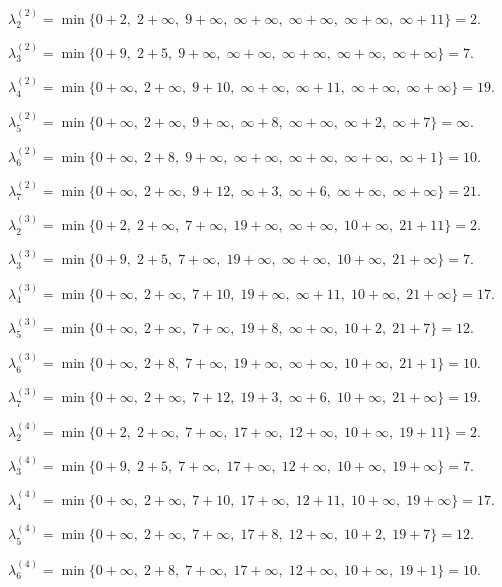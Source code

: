 \documentclass[fleqn]{article}
\begin{document}
$\lambda_2^{(2)} =\min\{0+2,\; 2+\infty,\; 9+\infty,\; \infty+\infty,\; \infty+\infty,\; \infty+\infty,\; \infty+11\}=2.$

$\lambda_3^{(2)} =\min\{0+9,\; 2+5,\; 9+\infty,\; \infty+\infty,\; \infty+\infty,\; \infty+\infty,\; \infty+\infty\}=7.$

$\lambda_4^{(2)} =\min\{0+\infty,\; 2+\infty,\; 9+10,\; \infty+\infty,\; \infty+11,\; \infty+\infty,\; \infty+\infty\}=19.$

$\lambda_5^{(2)} =\min\{0+\infty,\; 2+\infty,\; 9+\infty,\; \infty+8,\; \infty+\infty,\; \infty+2,\; \infty+7\}=\infty.$

$\lambda_6^{(2)} =\min\{0+\infty,\; 2+8,\; 9+\infty,\; \infty+\infty,\; \infty+\infty,\; \infty+\infty,\; \infty+1\}=10.$

$\lambda_7^{(2)} =\min\{0+\infty,\; 2+\infty,\; 9+12,\; \infty+3,\; \infty+6,\; \infty+\infty,\; \infty+\infty\}=21.$

\medskip

$\lambda_2^{(3)} =\min\{0+2,\; 2+\infty,\; 7+\infty,\; 19+\infty,\; \infty+\infty,\; 10+\infty,\; 21+11\}=2.$

$\lambda_3^{(3)} =\min\{0+9,\; 2+5,\; 7+\infty,\; 19+\infty,\; \infty+\infty,\; 10+\infty,\; 21+\infty\}=7.$

$\lambda_4^{(3)} =\min\{0+\infty,\; 2+\infty,\; 7+10,\; 19+\infty,\; \infty+11,\; 10+\infty,\; 21+\infty\}=17.$

$\lambda_5^{(3)} =\min\{0+\infty,\; 2+\infty,\; 7+\infty,\; 19+8,\; \infty+\infty,\; 10+2,\; 21+7\}=12.$

$\lambda_6^{(3)} =\min\{0+\infty,\; 2+8,\; 7+\infty,\; 19+\infty,\; \infty+\infty,\; 10+\infty,\; 21+1\}=10.$

$\lambda_7^{(3)} =\min\{0+\infty,\; 2+\infty,\; 7+12,\; 19+3,\; \infty+6,\; 10+\infty,\; 21+\infty\}=19.$


\medskip

$\lambda_2^{(4)} =\min\{0+2,\; 2+\infty,\; 7+\infty,\; 17+\infty,\; 12+\infty,\; 10+\infty,\; 19+11\}=2.$

$\lambda_3^{(4)} =\min\{0+9,\; 2+5,\; 7+\infty,\; 17+\infty,\; 12+\infty,\; 10+\infty,\; 19+\infty\}=7.$

$\lambda_4^{(4)} =\min\{0+\infty,\; 2+\infty,\; 7+10,\; 17+\infty,\; 12+11,\; 10+\infty,\; 19+\infty\}=17.$

$\lambda_5^{(4)} =\min\{0+\infty,\; 2+\infty,\; 7+\infty,\; 17+8,\; 12+\infty,\; 10+2,\; 19+7\}=12.$

$\lambda_6^{(4)} =\min\{0+\infty,\; 2+8,\; 7+\infty,\; 17+\infty,\; 12+\infty,\; 10+\infty,\; 19+1\}=10.$
\end{document}
